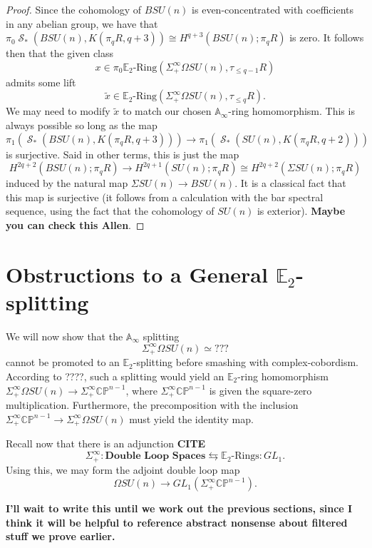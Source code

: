 \documentclass[reqno, oneside]{amsart}
\theoremstyle{definition}
\theoremstyle{plain}
\DeclareMathOperator{\cS}{\mathcal{S}}
\begin{document}
\begin{proof}
Since the cohomology of $BSU(n)$ is even-concentrated with coefficients in any abelian group, we have that $\pi_0 \cS_*(BSU(n),K(\pi_q R,q+3)) \cong H^{q+3}(BSU(n);\pi_q R)$ is zero.  It follows then that the given class $$x \in \pi_0 \mathbb{E}_2\text{-Ring}(\Sigma^{\infty}_+ \Omega SU(n), \tau_{\le q-1} R)$$ admits some lift $$\widetilde{x} \in \mathbb{E}_2\text{-Ring}(\Sigma^{\infty}_+ \Omega SU(n), \tau_{\le q} R).$$  We may need to modify $\widetilde{x}$ to match our chosen $\mathbb{A}_\infty$-ring homomorphism.  This is always possible so long as the map
$$\pi_1(\cS_*(BSU(n),K(\pi_q R,q+3))) \longrightarrow \pi_1(\cS_*(SU(n),K(\pi_q R,q+2)))$$
is surjective.  Said in other terms, this is just the map
$$H^{2q+2}(BSU(n);\pi_q R) \longrightarrow H^{2q+1}(SU(n);\pi_q R) \cong H^{2q+2}(\Sigma SU(n);\pi_q R)$$
induced by the natural map $\Sigma SU(n) \rightarrow BSU(n)$.  It is a classical fact that this map is surjective (it follows from a calculation with the bar spectral sequence, using the fact that the cohomology of $SU(n)$ is exterior). \textbf{Maybe you can check this Allen}.
\end{proof}

\section{Obstructions to a General \texorpdfstring{$\mathbb{E}_2$}{E2}-splitting}

We will now show that the $\mathbb{A}_\infty$ splitting $$\Sigma^{\infty}_+ \Omega SU(n) \simeq ???$$ cannot be promoted to an $\mathbb{E}_2$-splitting before smashing with complex-cobordism.  According to ????, such a splitting would yield an $\mathbb{E}_2$-ring homomorphism $\Sigma^{\infty}_+ \Omega SU(n) \rightarrow \Sigma^{\infty}_+ \mathbb{CP}^{n-1}$, where $\Sigma^{\infty}_+ \mathbb{CP}^{n-1}$ is given the square-zero multiplication.  Furthermore, the precomposition with the inclusion $\Sigma^{\infty}_+ \mathbb{CP}^{n-1} \longrightarrow \Sigma^{\infty}_+ \Omega SU(n)$ must yield the identity map.

Recall now that there is an adjunction \textbf{CITE}
$$\Sigma^{\infty}_+:\textbf{Double Loop Spaces} \leftrightarrows \mathbb{E}_2\text{-Rings}:GL_1.$$
Using this, we may form the adjoint double loop map
$$\Omega SU(n) \rightarrow GL_1(\Sigma^{\infty}_+ \mathbb{CP}^{n-1}).$$

\textbf{I'll wait to write this until we work out the previous sections, since I think it will be helpful to reference abstract nonsense about filtered stuff we prove earlier.}
\end{document}
